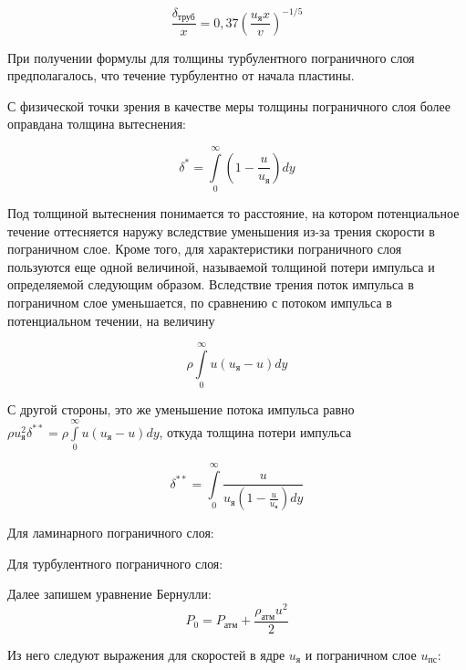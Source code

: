 \documentclass[a4paper]{article}
\begin{document}
$$\frac{\delta_\text{труб}}{x} = 0,37(\frac{u_\text{я} x}{v})^{-1/5} $$

При получении формулы для толщины турбулентного пограничного слоя предполагалось, что течение турбулентно от начала пластины.

С физической точки зрения в качестве меры толщины пограничного слоя более оправдана толщина вытеснения:

$$\delta ^{*} = \int\limits_0^\infty (1 - \frac{u}{u_\text{я}})dy$$

Под толщиной вытеснения понимается то расстояние, на котором потенциальное течение оттесняется наружу
вследствие уменьшения из-за трения скорости в пограничном слое. Кроме того, для характеристики пограничного слоя пользуются еще одной величиной, называемой толщиной потери импульса и определяемой следующим
образом. Вследствие трения поток импульса в пограничном слое уменьшается, по сравнению с потоком импульса
в потенциальном течении, на величину

$$\rho \int\limits_0^\infty u(u_\text{я} - u)dy$$

С другой стороны, это же уменьшение потока импульса равно 
$\rho u_\text{я} ^2 \delta^{**} = \rho \int\limits_0^\infty u(u_\text{я} - u)dy$, откуда толщина потери импульса 

$$\delta^{**} = \int\limits_0^\infty \frac{u}{u_\text{я} (1 - \frac{u}{u_\text{я}})dy} $$

Для ламинарного пограничного слоя: 
\begin{center}
\end{center}

Для турбулентного пограничного слоя:
\begin{center}
\end{center}

\vspace{0.5cm}
Далее запишем уравнение Бернулли:
$$P_0 = P_{\text{атм}} + \frac{\rho_{\text{атм}}u^2}{2}$$ 

Из него следуют выражения для скоростей в ядре $u_\text{я}$ и пограничном слое $u_\text{пс}$:

\begin{center}

    
\end{center}
\end{document}
